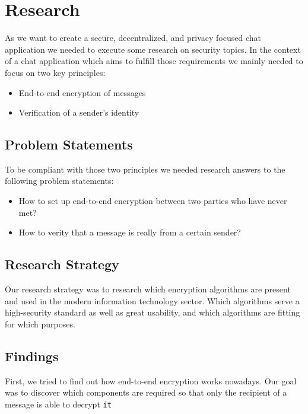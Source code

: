 \chapter{Research}\label{ch:research}

As we want to create a secure, decentralized, and privacy focused chat application we needed to execute some research on
security topics.
In the context of a chat application which aims to fulfill those requirements we mainly needed to focus on two key
principles:

\begin{itemize}
    \item End-to-end encryption of messages
    \item Verification of a sender's identity
\end{itemize}

\section{Problem Statements}\label{sec:problem-statements}

To be compliant with those two principles we needed research answers to the following problem statements:
\begin{itemize}
    \item How to set up end-to-end encryption between two parties who have never met?
    \item How to verity that a message is really from a certain sender?
\end{itemize}

\section{Research Strategy}\label{sec:research-strategy}
Our research strategy was to research which encryption algorithms are present and used in the modern information
technology sector.
Which algorithms serve a high-security standard as well as great usability, and which algorithms are fitting for which
purposes.

\section{Findings}\label{sec:findings}
First, we tried to find out how end-to-end encryption works nowadays.
Our goal was to discover which components are required so that only the recipient of a message is able to decrypt \texttt{it}

